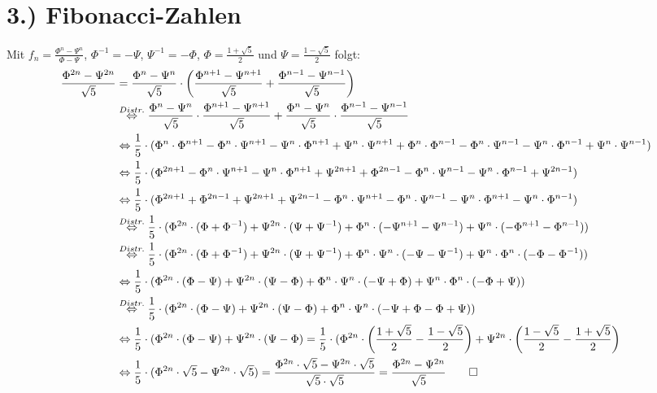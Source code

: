 \documentclass[titlepage]{article}
\begin{document}
	\section*{3.) Fibonacci-Zahlen}
		Mit $f_n=\frac{\Phi^n-\Psi^n}{\Phi-\Psi}$, $\Phi^{-1}=-\Psi$, $\Psi^{-1}=-\Phi$, $\Phi=\frac{1+\sqrt{5}}{2}$ und $\Psi=\frac{1-\sqrt{5}}{2}$ folgt:
		\begin{align*}
			\frac{\Phi^{2n}-\Psi^{2n}}{\sqrt{5}}&=\frac{\Phi^{n}-\Psi^{n}}{\sqrt{5}}\cdot\left(\frac{\Phi^{n+1}-\Psi^{n+1}}{\sqrt{5}}+\frac{\Phi^{n-1}-\Psi^{n-1}}{\sqrt{5}}\right)\\
			&\overset{Distr.}{\Leftrightarrow}\frac{\Phi^{n}-\Psi^{n}}{\sqrt{5}}\cdot\frac{\Phi^{n+1}-\Psi^{n+1}}{\sqrt{5}} +\frac{\Phi^{n}-\Psi^{n}}{\sqrt{5}}\cdot\frac{\Phi^{n-1}-\Psi^{n-1}}{\sqrt{5}}\\
			&\Leftrightarrow\frac{1}{5}\cdot(\Phi^n\cdot\Phi^{n+1}-\Phi^n\cdot\Psi^{n+1}-\Psi^n\cdot\Phi^{n+1}+\Psi^n\cdot\Psi^{n+1}+\Phi^n\cdot\Phi^{n-1}-\Phi^n\cdot\Psi^{n-1}-\Psi^n\cdot\Phi^{n-1}+\Psi^n\cdot\Psi^{n-1})\\
			&\Leftrightarrow\frac{1}{5}\cdot(\Phi^{2n+1}-\Phi^n\cdot\Psi^{n+1}-\Psi^n\cdot\Phi^{n+1}+\Psi^{2n+1}+\Phi^{2n-1}-\Phi^n\cdot\Psi^{n-1}-\Psi^n\cdot\Phi^{n-1}+\Psi^{2n-1})\\
			&\Leftrightarrow\frac{1}{5}\cdot(\Phi^{2n+1}+\Phi^{2n-1}+\Psi^{2n+1}+\Psi^{2n-1}-\Phi^n\cdot\Psi^{n+1}-\Phi^n\cdot\Psi^{n-1}-\Psi^n\cdot\Phi^{n+1}-\Psi^n\cdot\Phi^{n-1})\\
			&\overset{Distr.}{\Leftrightarrow}\frac{1}{5}\cdot(\Phi^{2n}\cdot(\Phi+\Phi^{-1})+\Psi^{2n}\cdot(\Psi+\Psi^{-1})+\Phi^n\cdot(-\Psi^{n+1}-\Psi^{n-1})+\Psi^n\cdot(-\Phi^{n+1}-\Phi^{n-1}))\\
			&\overset{Distr.}{\Leftrightarrow}\frac{1}{5}\cdot(\Phi^{2n}\cdot(\Phi+\Phi^{-1})+\Psi^{2n}\cdot(\Psi+\Psi^{-1})+\Phi^n\cdot\Psi^n\cdot(-\Psi-\Psi^{-1})+\Psi^n\cdot\Phi^n\cdot(-\Phi-\Phi^{-1}))\\	
			&\Leftrightarrow\frac{1}{5}\cdot(\Phi^{2n}\cdot(\Phi-\Psi)+\Psi^{2n}\cdot(\Psi-\Phi)+\Phi^n\cdot\Psi^n\cdot(-\Psi+\Phi)+\Psi^n\cdot\Phi^n\cdot(-\Phi+\Psi))\\
			&\overset{Distr.}{\Leftrightarrow}\frac{1}{5}\cdot(\Phi^{2n}\cdot(\Phi-\Psi)+\Psi^{2n}\cdot(\Psi-\Phi)+\Phi^n\cdot\Psi^n\cdot(-\Psi+\Phi-\Phi+\Psi))\\
			&\Leftrightarrow\frac{1}{5}\cdot(\Phi^{2n}\cdot(\Phi-\Psi)+\Psi^{2n}\cdot(\Psi-\Phi)=\frac{1}{5}\cdot(\Phi^{2n}\cdot\left(\frac{1+\sqrt{5}}{2}-\frac{1-\sqrt{5}}{2}\right)+\Psi^{2n}\cdot\left(\frac{1-\sqrt{5}}{2}-\frac{1+\sqrt{5}}{2}\right)\\
			&\Leftrightarrow\frac{1}{5}\cdot(\Phi^{2n}\cdot\sqrt{5}-\Psi^{2n}\cdot\sqrt{5})=\frac{\Phi^{2n}\cdot\sqrt{5}-\Psi^{2n}\cdot\sqrt{5}}{\sqrt{5}\cdot\sqrt{5}}=\frac{\Phi^{2n}-\Psi^{2n}}{\sqrt{5}}\qed
		\end{align*}
	\newpage
\end{document}

